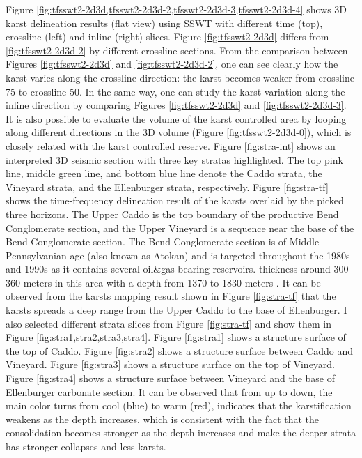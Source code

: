 Figure \ref{fig:tfsswt2-2d3d,tfsswt2-2d3d-2,tfsswt2-2d3d-3,tfsswt2-2d3d-4} shows 3D karst delineation results (flat view) using SSWT with different time (top), crossline (left) and inline (right) slices. Figure \ref{fig:tfsswt2-2d3d} differs from \ref{fig:tfsswt2-2d3d-2} by different crossline sections. From the comparison between Figures \ref{fig:tfsswt2-2d3d} and \ref{fig:tfsswt2-2d3d-2}, one can see clearly how the karst varies along the crossline direction: the karst becomes weaker from crossline 75 to crossline 50. In the same way, one can study the karst variation along the inline direction by comparing Figures \ref{fig:tfsswt2-2d3d} and \ref{fig:tfsswt2-2d3d-3}. %
It is also possible to evaluate the volume of the karst controlled area by looping along different directions in the 3D volume (Figure \ref{fig:tfsswt2-2d3d-0}), which is closely related with the karst controlled reserve.  Figure \ref{fig:stra-int} shows an interpreted 3D seismic section with three key stratas highlighted. The top pink line, middle green line, and bottom blue line denote the Caddo strata,  the Vineyard strata, and the Ellenburger strata, respectively. Figure \ref{fig:stra-tf} shows the time-frequency delineation result of the karsts overlaid by the picked three horizons. The Upper Caddo is the top boundary of the productive Bend Conglomerate section, and the Upper Vineyard is a sequence near the base of the Bend Conglomerate section. The Bend Conglomerate section is of Middle Pennsylvanian age (also known as Atokan) and is targeted throughout the 1980s and 1990s as it contains several oil\&gas bearing reservoirs.  thickness  around 300-360 meters in this area\new{,} with a depth from 1370 to 1830 meters \cite[]{hardage1996,hardage1996b}.   It can be observed from the karsts mapping result shown in Figure \ref{fig:stra-tf} that the karsts spreads a deep range from the Upper Caddo to the base of Ellenburger. %
I also selected different strata slices from Figure \ref{fig:stra-tf} and show them in Figure \ref{fig:stra1,stra2,stra3,stra4}. Figure \ref{fig:stra1} shows a structure surface of the top of Caddo. Figure \ref{fig:stra2} shows a structure surface between Caddo and Vineyard. Figure \ref{fig:stra3} shows a structure surface on the top of Vineyard. Figure \ref{fig:stra4} shows a structure surface between Vineyard and the base of Ellenburger carbonate section. It can be observed that from up to down, the main color turns from cool (blue) to warm (red), indicates that the karstification weakens as the depth increases, which is consistent with the fact that the consolidation becomes stronger as the depth increases and make the deeper strata has stronger collapses and less karsts.  
 

